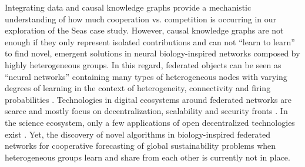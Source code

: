 \documentclass[11pt, a4paper]{article} %
\begin{document}
Integrating data and causal knowledge graphs provide a mechanistic
understanding of how much cooperation vs. competition is occurring in
our exploration of the Seas case study. However, causal knowledge
graphs are not enough if they only represent isolated contributions
and can not ``learn to learn'' to find novel, emergent solutions in
neural biology-inspired networks composed by highly heterogeneous groups. In
this regard, federated objects can be seen as ``neural networks''
containing many types of heterogeneous nodes with varying degrees of
learning in the context of heterogeneity, connectivity and firing
probabilities \citep{Maass2014,Maass2015}. Technologies in digital
ecosystems around federated networks are scarce and mostly focus on
decentralization, scalability and security fronts
\citep{Golem2016,Dilley2016,Durov2017,Androulaki2018,OceanProtocolFoundation2018,BigchainDBGmbH2018}. In
the science ecosystem, only a few applications of open decentralized
technologies exist \citep{Gunther2018}. Yet, the discovery of novel
algorithms in biology-inspired federated networks for cooperative
forecasting of global sustainability problems when heterogeneous
groups learn and share from each other is currently not in place.
\end{document}
